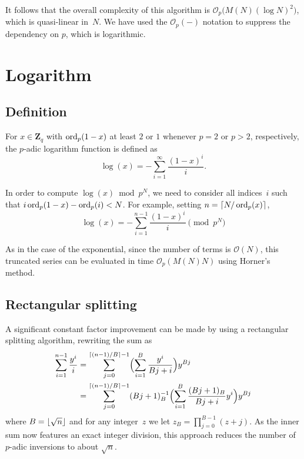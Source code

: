 It follows that the overall complexity of this algorithm is 
$\mathcal{O}_p\bigl(M(N) (\log N)^2\bigr)$, which is quasi-linear 
in~$N$.  We have used the $\mathcal{O}_p(-)$ notation to suppress 
the dependency on $p$, which is logarithmic.

\section{Logarithm}

\subsection{Definition}

For $x \in \mathbf{Z}_q$ with $\operatorname{ord}_p(1 - x)$ at least $2$ or $1$ 
whenever $p = 2$ or $p > 2$, respectively, the $p$-adic logarithm 
function is defined as 
\begin{equation}
\log(x) = - \sum_{i=1}^{\infty} \frac{(1-x)^i}{i}.
\end{equation}

In order to compute $\log(x) \bmod p^N$, we need to consider all 
indices~$i$ such that $i \operatorname{ord}_p(1-x) - \operatorname{ord}_p(i) < N$.  For example, 
setting $n = \left\lceil N/\operatorname{ord}_p(x)\right\rceil$, 
\begin{equation*}
\log(x) = - \sum_{i=1}^{n-1} \frac{(1-x)^i}{i} \pmod{p^N}
\end{equation*}

As in the case of the exponential, since the number of terms 
is $\mathcal{O}(N)$, this truncated series can be evaluated 
in time $\mathcal{O}_p(M(N) N)$ using Horner's method.

\subsection{Rectangular splitting}

A significant constant factor improvement can be made by using 
a rectangular splitting algorithm, rewriting the sum as 
\begin{align}
\sum_{i=1}^{n-1} \frac{y^i}{i}
& = \sum_{j=0}^{\left\lceil(n-1)/B\right\rceil - 1} \Bigl( \sum_{i=1}^B \frac{y^i}{Bj + i} \Bigr) y^{Bj} \\
& = \sum_{j=0}^{\left\lceil(n-1)/B\right\rceil - 1} (Bj+1)_B^{-1} \Bigl( \sum_{i=1}^B \frac{(Bj+1)_B}{Bj + i} y^i \Bigr) y^{Bj}
\end{align}
where $B = \left\lfloor\sqrt{n}\right\rfloor$ and for any integer~$z$ 
we let $z_B = \prod_{j=0}^{B-1} (z + j)$.  As the inner 
sum now features an exact integer division, this approach 
reduces the number of $p$-adic inversions to about $\sqrt{n}$.

